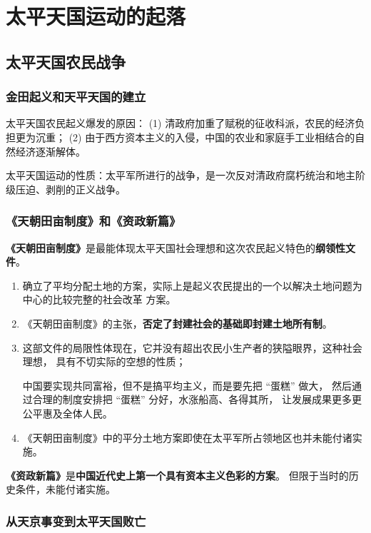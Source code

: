 \documentclass[10pt, UTF8]{book} %
\begin{document}
\section{太平天国运动的起落}

\subsection{太平天国农民战争}

\subsubsection{金田起义和天平天国的建立}

太平天国农民起义爆发的原因： (1) 清政府加重了赋税的征收科派，农民的经济负担更为沉重；
(2) 由于西方资本主义的入侵，中国的农业和家庭手工业相结合的自然经济逐渐解体。

太平天国运动的性质：太平军所进行的战争，是一次反对清政府腐朽统治和地主阶级压迫、剥削的正义战争。

\subsubsection{《天朝田亩制度》和《资政新篇》}

\textbf{《天朝田亩制度》}是最能体现太平天国社会理想和这次农民起义特色的\textbf{纲领性文件}。
\begin{enumerate}[label=(\arabic*), itemsep=0pt]
    \item 确立了平均分配土地的方案，实际上是起义农民提出的一个以解决土地问题为中心的比较完整的社会改革
    方案。
    \item《天朝田亩制度》的主张，\textbf{否定了封建社会的基础即封建土地所有制}。
    \item 这部文件的局限性体现在，它并没有超出农民小生产者的狭隘眼界，这种社会理想，
    具有不切实际的空想的性质；
    \begin{remark}
        中国要实现共同富裕，但不是搞平均主义，而是要先把 “蛋糕” 做大，
        然后通过合理的制度安排把 “蛋糕” 分好，水涨船高、各得其所，
        让发展成果更多更公平惠及全体人民。
    \end{remark}
    \item 《天朝田亩制度》中的平分土地方案即使在太平军所占领地区也并未能付诸实施。
\end{enumerate}

\textbf{《资政新篇》}是\textbf{中国近代史上第一个具有资本主义色彩的方案}。
但限于当时的历史条件，未能付诸实施。

\subsubsection{从天京事变到太平天国败亡}
\end{document}
